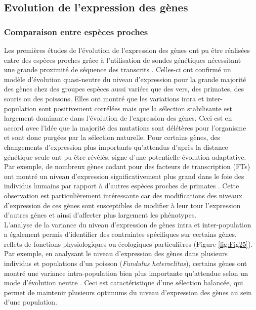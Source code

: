 \subsection{Evolution de l’expression des gènes}
\label{subsec:evol-expr}

\subsubsection{Comparaison entre espèces proches}
\label{subsec:comp-sp-proche}

Les premières études de l’évolution de l’expression des gènes ont pu être réalisées entre des espèces proches grâce à l’utilisation de sondes génétiques nécessitant une grande proximité de séquence des transcrits \citep{enard_intra-_2002,oleksiak_variation_2002,denver_transcriptional_2005,whitehead_neutral_2006, gilad_expression_2006}. Celles-ci ont confirmé un modèle d’évolution quasi-neutre du niveau d’expression pour la grande majorité des gènes chez des groupes espèces aussi variées que des vers, des primates, des souris ou des poissons. Elles ont montré que les variations intra et inter-population sont positivement corrélées mais que la sélection stabilisante est largement dominante dans l’évolution de l’expression des gènes. Ceci est en accord avec l’idée que la majorité des mutations sont délétères pour l’organisme et sont donc purgées par la sélection naturelle. Pour certains gènes, des changements d’expression plus importants qu'attendus d'après la distance génétique seule ont pu être révélés, signe d’une potentielle évolution adaptative. Par exemple, de nombreux gènes codant pour des facteurs de transcription (\acrshort{FT}s) ont montré un niveau d’expression significativement plus grand dans le foie des individus humains par rapport à d’autres espèces proches de primates \citep{gilad_expression_2006}. Cette observation est particulièrement intéressante car des modifications des niveaux d’expression de ces gènes sont susceptibles de modifier à leur tour l’expression d’autres gènes et ainsi d’affecter plus largement les phénotypes. \\

L’analyse de la variance du niveau d’expression de gènes intra et inter-population a également permis d’identifier des contraintes spécifiques sur certains gènes, reflets de fonctions physiologiques ou écologiques particulières (Figure \ref{fig:Fig25}). Par exemple, en analysant le niveau d’expression des gènes dans plusieurs individus et populations d’un poisson (\textit{Fundulus heteroclitus}), certains gènes ont montré une variance intra-population bien plus importante qu’attendue selon un mode d’évolution neutre \citep{whitehead_neutral_2006}. Ceci est caractéristique d’une sélection balancée, qui permet de maintenir plusieurs optimums du niveau d’expression des gènes au sein d’une population. 

